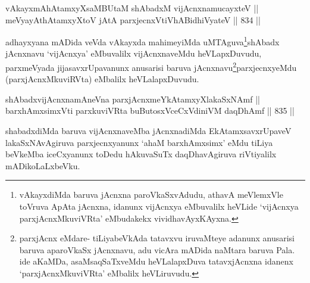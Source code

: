 
\begin{shl}
vAkayxmAhAtamxyXsaMBUtaM shAbadxM vijAcnxnamucayxteV || \\
meVyayAthAtamxyXtoV jAtA parxjecnxVtiVhABidhiVyateV \hfill || 834 ||  
\end{shl}

\begin{artha}
adhayxyana mADida veVda vAkayxda mahimeyiMda uMTAguva\break \footnote{vAkayxdiMda baruva jAcnxna paroVkaSxvAdudu, athavA meVlemxVle toVruva ApAta jAcnxna, idanunx vijAcnxya eMbuvalilx heVLide `vijAcnxya parxjAcnxMkuviVRta' eMbudakekx vividhavAyxKAyxna.}shAbadx jAcnxnavu `vijAcnxya' eMbuvalilx vijAcnxnaveMdu heVLapxDuvudu, parxmeVyada jijasavxrUpavanunx anusarisi baruva jAcnxnavu\break \footnote{parxjAcnx eMdare- tiLiyabeVkAda tatavxvu iruvaMteye adanunx anusarisi baruva aparoVkaSx jAcnxnavu, adu vicAra mADida naMtara baruva Pala. ide aKaMDa, asaMsaqSaTxveMdu heVLalapxDuva tatavxjAcnxna idanenx `parxjAcnxMkuviVRta' eMbalilx heVLiruvudu.}parxjecnxyeMdu (parxjAcnxMkuviRVta) eMbalilx heVLalapxDuvudu.
\end{artha}


\begin{shl}
shAbadxvijAcnxnamAneVna parxjAcnxmeYkAtamxyXlakaSxNAmf || \\
barxhAmxsimxVti parxkuviVRta buButosxVceCxVdiniVM daqDhAmf \hfill || 835 ||  
\end{shl}

\begin{artha}
shabadxdiMda baruva vijAcnxnaveMba jAcnxnadiMda EkAtamxsavxrUpaveV lakaSxNAvAgiruva parxjecnxyanunx `ahaM barxhAmxsimx' eMdu tiLiya beVkeMba iceCxyanunx toDedu hAkuvaSuTx daqDhavAgiruva riVtiyalilx mADikoLaLxbeVku.
\end{artha}



